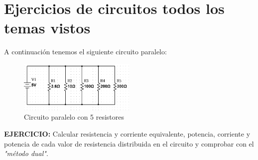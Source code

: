 \documentclass[a4paper,11pt]{article}
\begin{document}
\section{Ejercicios de circuitos todos los temas vistos}
\noindent A continuación tenemos el siguiente circuito paralelo:

\begin{figure}[H]
    \centering
    \includegraphics[width=0.5\textwidth]{images/ejercicio.PNG}
    \caption{Circuito paralelo con 5 resistores}
    \label{fg:ej}
\end{figure}
\noindent \textbf{EJERCICIO:} Calcular resistencia y corriente equivalente, potencia, corriente y potencia de cada valor de resistencia distribuida en el circuito y comprobar con el \textit{"método dual"}.
\end{document}
